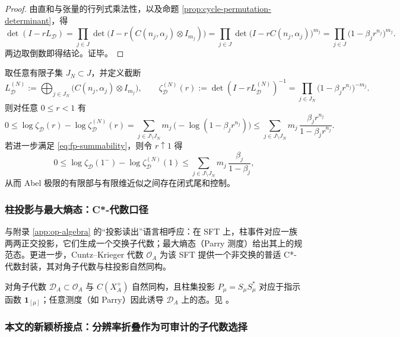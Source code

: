 \begin{proof}
由直和与张量的行列式乘法性，以及命题 \ref{prop:cycle-permutation-determinant}，得
\[
\det(I-rL_{\mathcal D})
=\prod_{j\in J}\det\bigl(I-r(C(n_j,\alpha_j)\otimes I_{m_j})\bigr)
=\prod_{j\in J}\det\bigl(I-rC(n_j,\alpha_j)\bigr)^{m_j}
=\prod_{j\in J}\bigl(1-\beta_j r^{n_j}\bigr)^{m_j}.
\]
两边取倒数即得结论。证毕。
\end{proof}

\begin{corollary}[有限维截断与尾和误差账本]\label{cor:cyclic-truncation-bounds}
取任意有限子集 \(J_N\subset J\)，并定义截断
\[
L_{\mathcal D}^{(N)}:=\bigoplus_{j\in J_N}\bigl(C(n_j,\alpha_j)\otimes I_{m_j}\bigr),
\qquad
\zeta_{\mathcal D}^{(N)}(r):=\det(I-rL_{\mathcal D}^{(N)})^{-1}
=\prod_{j\in J_N}\bigl(1-\beta_j r^{n_j}\bigr)^{-m_j}.
\]
则对任意 \(0\le r<1\) 有
\[
0\le \log \zeta_{\mathcal D}(r)-\log \zeta_{\mathcal D}^{(N)}(r)
=\sum_{j\in J\setminus J_N} m_j\,\bigl(-\log(1-\beta_j r^{n_j})\bigr)
\le
\sum_{j\in J\setminus J_N} m_j\,\frac{\beta_j r^{n_j}}{1-\beta_j r^{n_j}}.
\]
若进一步满足 \eqref{eq:fp-summability}，则令 \(r\uparrow 1\) 得
\[
0\le \log \zeta_{\mathcal D}(1^-)-\log \zeta_{\mathcal D}^{(N)}(1)
\le
\sum_{j\in J\setminus J_N} m_j\,\frac{\beta_j}{1-\beta_j},
\]
从而 Abel 极限的有限部与有限维近似之间存在闭式尾和控制。
\end{corollary}

\subsubsection{柱投影与最大熵态：C*-代数口径}

与附录 \ref{app:op-algebra} 的“投影读出”语言相呼应：在 SFT 上，柱事件对应一族两两正交投影，它们生成一个交换子代数；最大熵态（Parry 测度）给出其上的规范态。更进一步，Cuntz--Krieger 代数 $\mathcal{O}_A$ 为该 SFT 提供一个非交换的普适 C*-代数封装，其对角子代数与柱投影自然同构。

\begin{remark}\label{prop:ck-diagonal-cylinders}
对角子代数 \(\mathcal{D}_A\subset\mathcal{O}_A\) 与 \(C(X_A^+)\) 自然同构，且柱集投影 \(P_\mu=S_\mu S_\mu^*\) 对应于指示函数 \(\mathbf{1}_{[\mu]}\)；任意测度（如 Parry）因此诱导 \(\mathcal{D}_A\) 上的态。见 \cite{CuntzKrieger1980}。
\end{remark}

\subsubsection{本文的新颖桥接点：分辨率折叠作为可审计的子代数选择}

